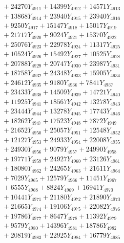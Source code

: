 \documentclass[a4paper,10pt]{article}
\begin{document}
{\begin{align}
&\;  + 24270 Y_{4911} + 14399 Y_{4912} + 14571 Y_{4913} \\[0.3ex]
&\;  + 13868 Y_{4914} + 23940 Y_{4915} + 23940 Y_{4916} \\[0.3ex]
&\;  + 9250 Y_{4917} + 15147 Y_{4918} + 15017 Y_{4919} \\[0.5ex]\allowbreak
&\;  + 21717 Y_{4920} + 9024 Y_{4921} + 15370 Y_{4922} \\[0.3ex]
&\;  + 25076 Y_{4923} + 22978 Y_{4924} + 11317 Y_{4925} \\[0.3ex]
&\;  + 10524 Y_{4926} + 15492 Y_{4927} + 10525 Y_{4928} \\[0.3ex]
&\;  + 20788 Y_{4929} + 20747 Y_{4930} + 23987 Y_{4931} \\[0.3ex]
&\;  + 18758 Y_{4932} + 24348 Y_{4933} + 15905 Y_{4934} \\[0.3ex]
&\;  + 24612 Y_{4935} + 9180 Y_{4936} + 7841 Y_{4937} \\[0.3ex]
&\;  + 23433 Y_{4938} + 14509 Y_{4939} + 14721 Y_{4940} \\[0.3ex]
&\;  + 11925 Y_{4941} + 18567 Y_{4942} + 13278 Y_{4943} \\[0.3ex]
&\;  + 23444 Y_{4944} + 13278 Y_{4945} + 17743 Y_{4946} \\[0.3ex]
&\;  + 18262 Y_{4947} + 17523 Y_{4948} + 7872 Y_{4949} \\[0.5ex]\allowbreak
&\;  + 21652 Y_{4950} + 25057 Y_{4951} + 12548 Y_{4952} \\[0.3ex]
&\;  + 12127 Y_{4953} + 24933 Y_{4954} + 22008 Y_{4955} \\[0.3ex]
&\;  + 24930 Y_{4956} + 9079 Y_{4957} + 24990 Y_{4958} \\[0.3ex]
&\;  + 19771 Y_{4959} + 24927 Y_{4960} + 23126 Y_{4961} \\[0.3ex]
&\;  + 18080 Y_{4962} + 24265 Y_{4963} + 21611 Y_{4964} \\[0.3ex]
&\;  + 7029 Y_{4965} + 12579 Y_{4966} + 11451 Y_{4967} \\[0.3ex]
&\;  + 6555 Y_{4968} + 8824 Y_{4969} + 16941 Y_{4970} \\[0.3ex]
&\;  + 10441 Y_{4971} + 21180 Y_{4972} + 21890 Y_{4973} \\[0.3ex]
&\;  + 21665 Y_{4974} + 19106 Y_{4975} + 22082 Y_{4976} \\[0.3ex]
&\;  + 19786 Y_{4977} + 8647 Y_{4978} + 11392 Y_{4979} \\[0.5ex]\allowbreak
&\;  + 9579 Y_{4980} + 14396 Y_{4981} + 18786 Y_{4982} \\[0.3ex]
&\;  + 20819 Y_{4983} + 22925 Y_{4984} + 16779 Y_{4985} \\[0.3ex]

\end{align}}
\end{document}
